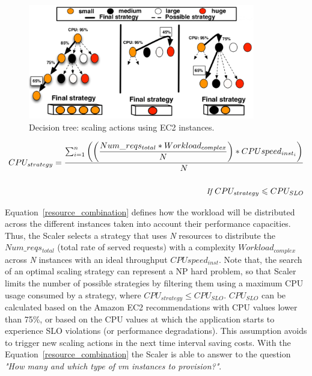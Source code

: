 \begin{figure}[htb]
  \begin{center}
    \includegraphics[height=5cm]{images/scalingTree}
  \end{center}
\vspace{-5mm}
  \caption{Decision tree: scaling actions using EC2 instances.}
  \label{fig:scalingTree}
\end{figure}





{\scriptsize
\begin{equation}\label{resource_combination}
\begin{split}
CPU_{strategy} = \dfrac{ \sum_{i=1}^n \bigg( \bigg( \dfrac{ Num\_reqs_{total} * Workload_{complex} }  {N}  \bigg) * CPU speed_{inst_{i}} \bigg) }  {N} \\ 
\\ {\small \textit{ If } CPU_{strategy} \leqslant CPU_{SLO} }
\end{split}
\end{equation}
}

Equation~\ref{resource_combination} defines how the workload will be distributed across the different instances taken into account their performance capacities.  Thus, the Scaler selects a strategy that uses \emph{N} resources to distribute the \emph{$Num\_reqs_{total}$} (total rate of served requests) with a complexity \emph{$Workload_{complex}$} across \emph{N} instances with an ideal throughput \emph{$CPUspeed_{inst}$}. Note that, the search of an optimal scaling strategy can represent a NP hard problem, so that Scaler limits the number of possible strategies by filtering them using a maximum CPU usage consumed by a strategy, where \emph{$CPU_{strategy} \leq CPU_{SLO}$}. \emph{$CPU_{SLO}$} can be calculated based on the Amazon EC2 recommendations with CPU values lower than 75\%, or based on the CPU values at which the application starts to experience SLO violations (or performance degradations). This assumption avoids to trigger new scaling actions in the next time interval saving costs. With the Equation~\ref{resource_combination} the Scaler is able to answer to the question \emph{"How many and which type of vm instances to provision?"}.

